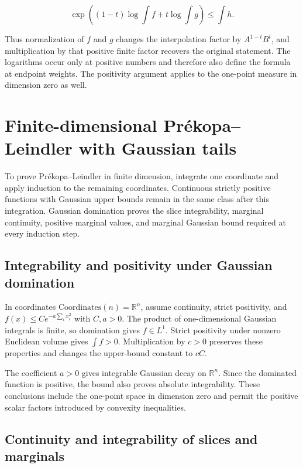 \documentclass[11pt,a4paper]{article}
\begin{document}
\[\exp\!\left((1-t)\log\int f+t\log\int g\right)\le\int h.\]

Thus normalization of \(f\) and \(g\) changes the interpolation factor by \(A^{1-t}B^t\), and multiplication by that positive finite factor recovers the original statement. The logarithms occur only at positive numbers and therefore also define the formula at endpoint weights. The positivity argument applies to the one-point measure in dimension zero as well.



\section{\texorpdfstring{Finite-dimensional Prékopa–Leindler with Gaussian tails}{Finite-dimensional Prékopa–Leindler with Gaussian tails}}


To prove Prékopa–Leindler in finite dimension, integrate one coordinate and apply induction to the remaining coordinates. Continuous strictly positive functions with Gaussian upper bounds remain in the same class after this integration. Gaussian domination proves the slice integrability, marginal continuity, positive marginal values, and marginal Gaussian bound required at every induction step.


\subsection{\texorpdfstring{Integrability and positivity under Gaussian domination}{Integrability and positivity under Gaussian domination}}


In coordinates \(\mathrm{Coordinates}(n)=\mathbb R^n\), assume continuity, strict positivity, and \(f(x)\le Ce^{-a\sum_i x_i^2}\) with \(C,a>0\). The product of one-dimensional Gaussian integrals is finite, so domination gives \(f\in L^1\). Strict positivity under nonzero Euclidean volume gives \(\int f>0\). Multiplication by \(c>0\) preserves these properties and changes the upper-bound constant to \(cC\).



The coefficient \(a>0\) gives integrable Gaussian decay on \(\mathbb R^n\). Since the dominated function is positive, the bound also proves absolute integrability. These conclusions include the one-point space in dimension zero and permit the positive scalar factors introduced by convexity inequalities.



\subsection{\texorpdfstring{Continuity and integrability of slices and marginals}{Continuity and integrability of slices and marginals}}
\end{document}
